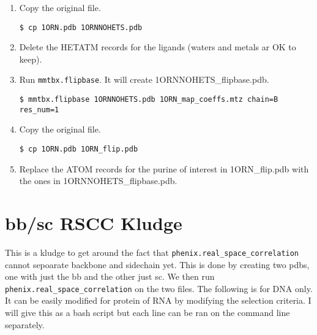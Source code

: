 \documentclass[12pt]{article}
\newcommand{\cmdline}[1]{\vspace{5mm} \noindent
\texttt{\$ #1}
\vspace{5mm}

}
\begin{document}
\begin{enumerate}
  \item Copy the original file.
  
  \vspace{-6mm}
  \cmdline{cp 1ORN.pdb 1ORNNOHETS.pdb}
  \vspace{-6mm}
  \item Delete the HETATM records for the ligands (waters and metals ar OK to keep).
  \item Run \texttt{mmtbx.flipbase}. It will create 1ORNNOHETS\_flipbase.pdb.
  
  \vspace{-6mm}
  \cmdline{mmtbx.flipbase 1ORNNOHETS.pdb 1ORN\_map\_coeffs.mtz chain=B res\_num=1}
  \vspace{-6mm}
  \item Copy the original file.
  
  \vspace{-6mm}
  \cmdline{cp 1ORN.pdb 1ORN\_flip.pdb}
  \vspace{-6mm}
  \item Replace the ATOM records for the purine of interest in 1ORN\_flip.pdb with the ones in 1ORNNOHETS\_flipbase.pdb.
\end{enumerate}

\section{bb/sc RSCC Kludge}
This is a kludge to get around the fact that \texttt{phenix.real\_space\_correlation} cannot sepoarate backbone and sidechain yet. This is done by creating two pdbs, one with just the bb and the other just sc. We then run \texttt{phenix.real\_space\_correlation} on the two files. The following is for DNA only. It can be easily modified for protein of RNA by modifying the selection criteria. I will give this as a bash script but each line can be ran on the command line separately.
\end{document}
